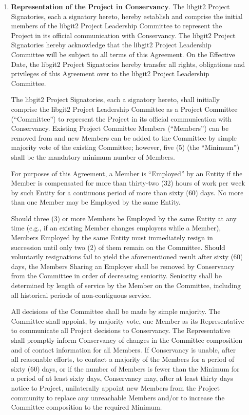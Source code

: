 \documentclass[letterpaper,12pt]{article}
\newcommand{\signatories}{libgit2 Project Signatories\xspace}
\newcommand{\leadershipbody}{libgit2 Project Leadership Committee\xspace}
\begin{document}
\begin{enumerate}[label=\arabic*.,ref=\S~\arabic*]
\item \textbf{Representation of the Project in Conservancy}. \label{Representation}The
\signatories, each a signatory hereto, hereby establish and comprise
the initial members of the \leadershipbody
to represent the Project in its official communication with Conservancy.
The \signatories hereby acknowledge that the \leadershipbody
will be subject to all terms of this Agreement.
On the Effective Date, the \signatories hereby transfer all
rights, obligations and privileges of this Agreement over to the
\leadershipbody.

The \signatories, each a signatory hereto, shall initially comprise
the \leadershipbody as a Project Committee (``Committee'') to represent
the Project in its official communication with Conservancy. Existing Project
Committee Members (``Members'') can be removed from and new Members
can be added to the Committee by simple majority vote of the existing
Committee; however, five (5) (the ``Minimum'') shall be the mandatory
minimum number of Members.

For purposes of this Agreement, a Member is ``Employed'' by an Entity
if the Member is compensated for more than thirty-two (32) hours of
work per week by such Entity for a continuous period of more than
sixty (60) days. No more than one Member may be Employed by the same
Entity.

Should three (3) or more Members be Employed by the same Entity at any
time (e.g., if an existing Member changes employers while a Member),
Members Employed by the same Entity must immediately resign in succession
until only two (2) of them remain on the Committee. Should voluntarily
resignations fail to yield the aforementioned result after sixty (60)
days, the Members Sharing an Employer shall be removed by Conservancy
from the Committee in order of decreasing seniority. Seniority shall
be determined by length of service by the Member on the Committee,
including all historical periods of non-contiguous service.

All decisions of the Committee shall be made by simple majority. The
Committee shall appoint, by majority vote, one Member as its Representative
to communicate all Project decisions to Conservancy. The Representative
shall promptly inform Conservancy of changes in the Committee composition
and of contact information for all Members. If Conservancy is unable,
after all reasonable efforts, to contact a majority of the Members
for a period of sixty (60) days, or if the number of Members is fewer
than the Minimum for a period of at least sixty days, Conservancy
may, after at least thirty days notice to Project, unilaterally appoint
new Members from the Project community to replace any unreachable
Members and/or to increase the Committee composition to the required
Minimum.


\end{enumerate}
\end{document}
